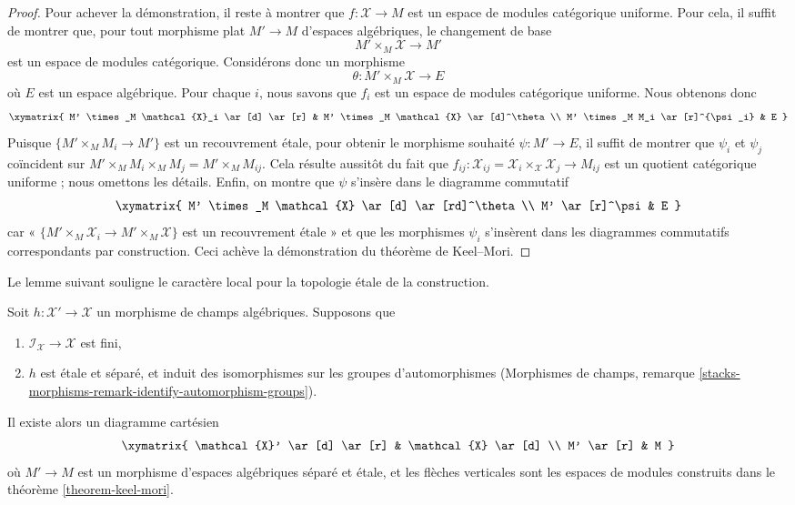 \begin{proof}
\medskip\noindent
Pour achever la démonstration, il reste à montrer que $f : \mathcal{X} \to M$
est un espace de modules catégorique uniforme.
Pour cela, il suffit de montrer que, pour tout morphisme plat
$M' \to M$ d'espaces algébriques, le changement de base
$$
M' \times_M \mathcal{X} \longrightarrow M'
$$
est un espace de modules catégorique. Considérons donc un morphisme
$$
\theta : M' \times_M \mathcal{X} \longrightarrow E
$$
où $E$ est un espace algébrique. Pour chaque $i$, nous savons que
$f_i$ est un espace de modules catégorique uniforme. Nous obtenons donc
$$
\xymatrix{
M' \times_M \mathcal{X}_i \ar[d] \ar[r] &
M' \times_M \mathcal{X} \ar[d]^\theta \\
M' \times_M M_i \ar[r]^{\psi_i} &
E
}
$$
Puisque $\{M' \times_M M_i \to M'\}$ est un recouvrement \'etale,
pour obtenir le morphisme souhaité $\psi : M' \to E$, il suffit
de montrer que $\psi_i$ et $\psi_j$ coïncident sur
$M' \times_M M_i \times_M M_j = M' \times_M M_{ij}$.
Cela résulte aussitôt du fait que
$f_{ij} : \mathcal{X}_{ij} =
\mathcal{X}_i \times_\mathcal{X} \mathcal{X}_j \to M_{ij}$ est un quotient catégorique
uniforme ; nous omettons les détails.
Enfin, on montre que $\psi$ s'insère dans le diagramme commutatif
$$
\xymatrix{
M' \times_M \mathcal{X} \ar[d] \ar[rd]^\theta \\
M' \ar[r]^\psi &
E
}
$$
car « $\{M' \times_M \mathcal{X}_i \to M' \times_M \mathcal{X}\}$
est un recouvrement \'etale » et que les morphismes $\psi_i$ s'insèrent dans les
diagrammes commutatifs correspondants par construction.
Ceci achève la démonstration du théorème de Keel--Mori.
\end{proof}

\noindent
Le lemme suivant souligne le caractère local pour la topologie \'etale de la construction.

\begin{lemma}
\label{lemma-etale-separated-over-keel-mori}
Soit $h : \mathcal{X}' \to \mathcal{X}$ un morphisme de champs algébriques.
Supposons que
\begin{enumerate}
\item $\mathcal{I}_\mathcal{X} \to \mathcal{X}$ est fini,
\item $h$ est \'etale et séparé, et induit des isomorphismes sur les
groupes d'automorphismes (Morphismes de champs, remarque
\ref{stacks-morphisms-remark-identify-automorphism-groups}).
\end{enumerate}
Il existe alors un diagramme cartésien
$$
\xymatrix{
\mathcal{X}' \ar[d] \ar[r] &
\mathcal{X} \ar[d] \\
M' \ar[r] &
M
}
$$
où $M' \to M$ est un morphisme d'espaces algébriques séparé et \'etale, et
les flèches verticales sont les espaces de modules construits dans le
théorème \ref{theorem-keel-mori}.
\end{lemma}

